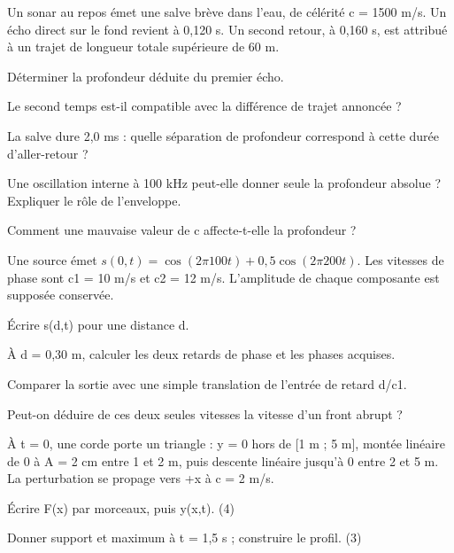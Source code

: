 \label{ex-D2}
Un sonar au repos émet une salve brève dans l’eau, de célérité c = 1500 m/s. Un écho direct sur le fond revient à 0,120 s. Un second retour, à 0,160 s, est attribué à un trajet de longueur totale supérieure de 60 m.\begin{questions}
\item Déterminer la profondeur déduite du premier écho.
\item Le second temps est-il compatible avec la différence de trajet annoncée ?
\item La salve dure 2,0 ms : quelle séparation de profondeur correspond à cette durée d’aller-retour ?
\item Une oscillation interne à 100 kHz peut-elle donner seule la profondeur absolue ? Expliquer le rôle de l’enveloppe.
\item Comment une mauvaise valeur de c affecte-t-elle la profondeur ?
\end{questions}


\label{ex-D3}
Une source émet $s(0,t)=\cos(2\pi100t)+0{,}5\cos(2\pi200t)$. Les vitesses de phase sont c1 = 10 m/s et c2 = 12 m/s. L’amplitude de chaque composante est supposée conservée.\begin{questions}
\item Écrire s(d,t) pour une distance d.
\item À d = 0,30 m, calculer les deux retards de phase et les phases acquises.
\item Comparer la sortie avec une simple translation de l’entrée de retard d/c1.
\item Peut-on déduire de ces deux seules vitesses la vitesse d’un front abrupt ?
\end{questions}


À t = 0, une corde porte un triangle : y = 0 hors de [1 m ; 5 m], montée linéaire de 0 à A = 2 cm entre 1 et 2 m, puis descente linéaire jusqu’à 0 entre 2 et 5 m. La perturbation se propage vers +x à c = 2 m/s.
\begin{questions}
\item Écrire F(x) par morceaux, puis y(x,t). (4)
\item Donner support et maximum à t = 1,5 s ; construire le profil. (3)
\end{questions}

